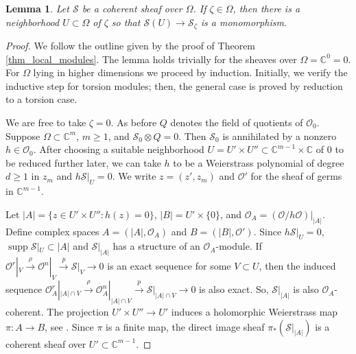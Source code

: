 \documentclass{amsart}
\numberwithin{equation}{section}
\theoremstyle{definition}
\theoremstyle{plain}
\newtheorem{lemma}[definition]{Lemma}
\theoremstyle{remark}
\begin{document}
\begin{lemma}\label{lemma_epimorphisms_mono}
Let ${\ensuremath{\mathcal{{S}}}}$ be a coherent sheaf over $\Omega$. If $\zeta\in\Omega$, then
there is a neighborhood $U\subset\Omega$ of $\zeta$ so that ${\ensuremath{\mathcal{{S}}}}(U)\rightarrow{\ensuremath{\mathcal{{S}}}}_\zeta$ is a monomorphism.
\end{lemma}
\begin{proof}
We follow the outline given by the proof of 
 Theorem \ref{thm_local_modules}. 
The lemma holds trivially for the sheaves over $\Omega=\mathbb{C}^0=0$.
For $\Omega$ lying in higher dimensions we proceed by induction.
Initially,
we verify 
the inductive step for torsion
modules; then, the general case is proved by reduction to a torsion case. 

We are free to take $\zeta=0$.
As before $Q$ denotes the field of quotients of ${\ensuremath{\mathcal{{O}}}}_0$.
Suppose $\Omega\subset\mathbb{C}^m$, $m\geq 1$, and ${\ensuremath{\mathcal{{S}}}}_0\otimes
Q=0$. 
Then ${\ensuremath{\mathcal{{S}}}}_0$ is annihilated by a nonzero $h\in{\ensuremath{\mathcal{{O}}}}_0$.
After choosing a suitable neighborhood 
$U=U'\times U''\subset\mathbb{C}^{m-1}\times\mathbb{C}$ of $0$
to be reduced further later, 
we can take $h$ to be a Weierstrass
polynomial of degree $d\geq 1$ in $z_m$ and $h{\ensuremath{\mathcal{{S}}}}|_U=0$. 
We write $z=(z',z_m)$ and ${\ensuremath{\mathcal{{O}}}}'$
for the sheaf of germs in $\mathbb{C}^{m-1}$. 

Let $|A|=\{z\in U'\times U'': h(z)=0\}$,  $|B|=U'\times \{0\}$, and 
${\ensuremath{\mathcal{{O}}}}_A=({\ensuremath{\mathcal{{O}}}}/h{\ensuremath{\mathcal{{O}}}})|_{|A|}$.
Define complex spaces $A=(|A|,{\ensuremath{\mathcal{{O}}}}_A)$ and $B=(|B|,{\ensuremath{\mathcal{{O}}}}')$. 
Since $h{\ensuremath{\mathcal{{S}}}}|_{U}=0$, ${\mathop{\mathrm{supp}}} {\ensuremath{\mathcal{{S}}}}|_U\subset|A|$ and
${\ensuremath{\mathcal{{S}}}}|_{|A|}$ has a structure of an ${\ensuremath{\mathcal{{O}}}}_A$-module.  
If 
${\ensuremath{\mathcal{{O}}}}^r|_V\xrightarrow{\rho}{\ensuremath{\mathcal{{O}}}}^n|_V\xrightarrow{p}{\ensuremath{\mathcal{{S}}}}|_V\rightarrow 0$ 
is an exact sequence
for some $V\subset U$,
then 
the induced sequence 
${\ensuremath{\mathcal{{O}}}}_A^r|_{|A|\cap V}\xrightarrow{\rho}{\ensuremath{\mathcal{{O}}}}_A^n|_{|A|\cap V}
\xrightarrow{p}{\ensuremath{\mathcal{{S}}}}|_{|A|\cap V}\rightarrow 0$
is also exact. So, ${\ensuremath{\mathcal{{S}}}}|_{|A|}$ is also ${\ensuremath{\mathcal{{O}}}}_A$-coherent.  
The projection $U'\times U'' \rightarrow U'$ induces a holomorphic Weierstrass map 
$\pi:A\rightarrow B$, see \cite[Section 2.3.4]{GR}. Since $\pi$ is a finite map,
the direct image sheaf $\pi_*({\ensuremath{\mathcal{{S}}}}|_{|A|})$ is a coherent sheaf
 over $U'\subset\mathbb{C}^{m-1}$.


\end{proof}
\end{document}

